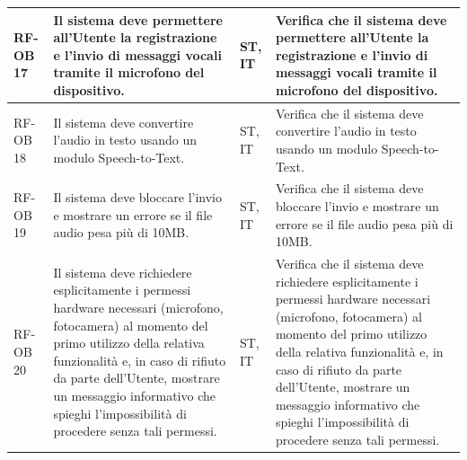 \documentclass[a4paper,11pt,oneside]{scrartcl}
\begin{document}
\begin{longtable}{|p{1.5cm}|p{4.5cm}|p{1.8cm}|p{6cm}|}
    RF-OB 17         & Il sistema deve permettere all'Utente la registrazione e l'invio di messaggi vocali tramite il microfono del dispositivo.                                                                                                                                                                             & ST, IT             & Verifica che il sistema deve permettere all'Utente la registrazione e l'invio di messaggi vocali tramite il microfono del dispositivo.                                                                                                                                                                             \\ \hline
    RF-OB 18         & Il sistema deve convertire l'audio in testo usando un modulo Speech-to-Text.                                                                                                                                                                                                                          & ST, IT             & Verifica che il sistema deve convertire l'audio in testo usando un modulo Speech-to-Text.                                                                                                                                                                                                                          \\ \hline
    RF-OB 19         & Il sistema deve bloccare l'invio e mostrare un errore se il file audio pesa più di 10MB.                                                                                                                                                                                                              & ST, IT             & Verifica che il sistema deve bloccare l'invio e mostrare un errore se il file audio pesa più di 10MB.                                                                                                                                                                                                              \\ \hline
    RF-OB 20         & Il sistema deve richiedere esplicitamente i permessi hardware necessari (microfono, fotocamera) al momento del primo utilizzo della relativa funzionalità e, in caso di rifiuto da parte dell'Utente, mostrare un messaggio informativo che spieghi l'impossibilità di procedere senza tali permessi. & ST, IT             & Verifica che il sistema deve richiedere esplicitamente i permessi hardware necessari (microfono, fotocamera) al momento del primo utilizzo della relativa funzionalità e, in caso di rifiuto da parte dell'Utente, mostrare un messaggio informativo che spieghi l'impossibilità di procedere senza tali permessi. \\ \hline

\end{longtable}
\end{document}
